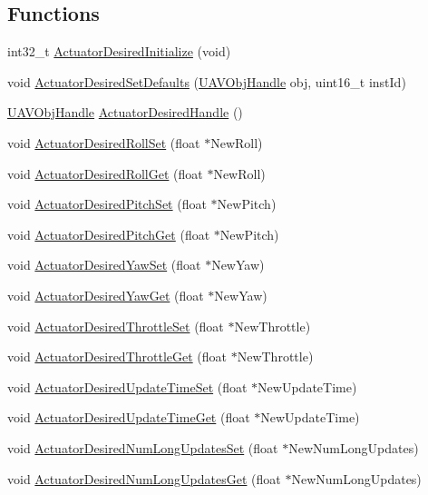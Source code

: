 \subsection*{\-Functions}
\begin{DoxyCompactItemize}
\item 
int32\-\_\-t \hyperlink{group___actuator_desired_ga21cd58f9362bed0b3fe87ff7eba40573}{\-Actuator\-Desired\-Initialize} (void)
\item 
void \hyperlink{group___actuator_desired_ga0119a6528b5a4883331778ba41eb36bc}{\-Actuator\-Desired\-Set\-Defaults} (\hyperlink{targets_2_u_a_v_objects_2inc_2uavobjectmanager_8h_a279053e22be53ce9f895043aaeb91e3b}{\-U\-A\-V\-Obj\-Handle} obj, uint16\-\_\-t inst\-Id)
\item 
\hyperlink{targets_2_u_a_v_objects_2inc_2uavobjectmanager_8h_a279053e22be53ce9f895043aaeb91e3b}{\-U\-A\-V\-Obj\-Handle} \hyperlink{group___actuator_desired_gaa4bd680f946679ca68b29b2e39011af6}{\-Actuator\-Desired\-Handle} ()
\item 
void \hyperlink{group___actuator_desired_ga9bcafd4dcc1241f901b4e196d10e119d}{\-Actuator\-Desired\-Roll\-Set} (float $\ast$\-New\-Roll)
\item 
void \hyperlink{group___actuator_desired_gad557dbfc3a085a6ca4fba26d33cfa051}{\-Actuator\-Desired\-Roll\-Get} (float $\ast$\-New\-Roll)
\item 
void \hyperlink{group___actuator_desired_gadb69c82a9dff4b1ad3628b1a9d5ca275}{\-Actuator\-Desired\-Pitch\-Set} (float $\ast$\-New\-Pitch)
\item 
void \hyperlink{group___actuator_desired_ga56b07f17eee6c26cfef9c3207ee48ad2}{\-Actuator\-Desired\-Pitch\-Get} (float $\ast$\-New\-Pitch)
\item 
void \hyperlink{group___actuator_desired_ga0fb3ea4542523b3236e700136c2a38f4}{\-Actuator\-Desired\-Yaw\-Set} (float $\ast$\-New\-Yaw)
\item 
void \hyperlink{group___actuator_desired_gab2890e2ba3c9b10f3369e9644f620808}{\-Actuator\-Desired\-Yaw\-Get} (float $\ast$\-New\-Yaw)
\item 
void \hyperlink{group___actuator_desired_ga87e6cbb04d6595257ca7fa14c9191029}{\-Actuator\-Desired\-Throttle\-Set} (float $\ast$\-New\-Throttle)
\item 
void \hyperlink{group___actuator_desired_ga5e5e408281e3145c1227f35ede05a85b}{\-Actuator\-Desired\-Throttle\-Get} (float $\ast$\-New\-Throttle)
\item 
void \hyperlink{group___actuator_desired_ga159ed63742ae10f9159e4c790beba152}{\-Actuator\-Desired\-Update\-Time\-Set} (float $\ast$\-New\-Update\-Time)
\item 
void \hyperlink{group___actuator_desired_ga9ad72774870f4e25b1da8260a8d4f449}{\-Actuator\-Desired\-Update\-Time\-Get} (float $\ast$\-New\-Update\-Time)
\item 
void \hyperlink{group___actuator_desired_gadb5e40fe8e21658e73b6291667e649cb}{\-Actuator\-Desired\-Num\-Long\-Updates\-Set} (float $\ast$\-New\-Num\-Long\-Updates)
\item 
void \hyperlink{group___actuator_desired_gac23143b35565b30c96a9d00c6a527a57}{\-Actuator\-Desired\-Num\-Long\-Updates\-Get} (float $\ast$\-New\-Num\-Long\-Updates)
\end{DoxyCompactItemize}
